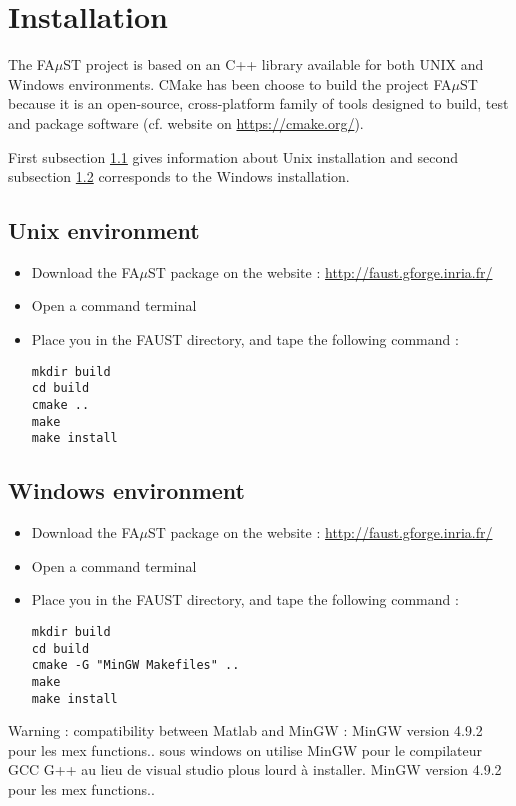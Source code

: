 
\section{Installation}\label{sec:install}

The FA$\mu$ST project is based on an C++ library available for both UNIX and Windows environments. 
CMake has been choose to build the project FA$\mu$ST because it is an open-source, cross-platform family of tools designed to build, test and package software (cf. website on \url{https://cmake.org/}).

First subsection \ref{sec:UnixInstall} gives information about Unix installation and second subsection \ref{sec:WinInstall} corresponds to the Windows installation. 

\subsection{Unix environment}\label{sec:UnixInstall}

\begin{itemize}
\item Download the FA$\mu$ST package on the website :  \url{http://faust.gforge.inria.fr/}
\item Open a command terminal
\item Place you in the FAUST directory, and tape the following command : 
\begin{lstlisting}
mkdir build
cd build
cmake ..
make
make install
\end{lstlisting}
\end{itemize}



\subsection{Windows environment}\label{sec:WinInstall}


\begin{itemize}
\item Download the FA$\mu$ST package on the website :  \url{http://faust.gforge.inria.fr/}
\item Open a command terminal
\item Place you in the FAUST directory, and tape the following command : 
\begin{lstlisting}
mkdir build
cd build
cmake -G "MinGW Makefiles" ..
make
make install
\end{lstlisting}
\end{itemize}

Warning : 
compatibility between Matlab and MinGW :
MinGW version 4.9.2 pour les mex functions..
sous windows on utilise MinGW pour le compilateur GCC G++ au lieu de visual studio plous lourd à installer. MinGW version 4.9.2 pour les mex functions..
